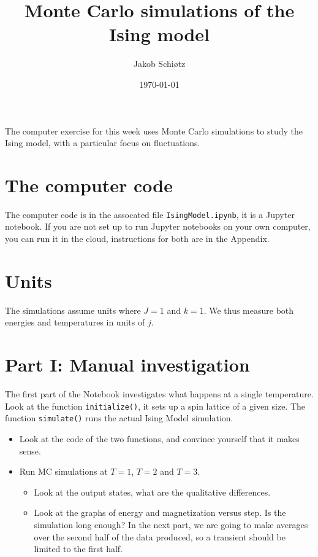 \documentclass[a4paper,11pt]{article}
\begin{document}
\title{Monte Carlo simulations of the Ising model}
\author{Jakob Schiøtz}
\date{\today}
\maketitle

The computer exercise for this week uses Monte Carlo simulations to
study the Ising model, with a particular focus on fluctuations.

\section{The computer code}

The computer code is in the assocated file \texttt{IsingModel.ipynb},
it is a Jupyter notebook.  If you are not set up to run Jupyter
notebooks on your own computer, you can run it in the cloud,
instructions for both are in the Appendix.

\section{Units}

The simulations assume units where $J=1$ and $k=1$.  We thus measure
both energies and temperatures in units of $j$.

\section{Part I: Manual investigation}

The first part of the Notebook investigates what happens at a single
temperature.  Look at the function \texttt{initialize()}, it sets up a
spin lattice of a given size.  The function \texttt{simulate()} runs
the actual Ising Model simulation.

\begin{itemize}
\item Look at the code of the two functions, and convince yourself
  that it makes sense.
\item Run MC simulations at $T=1$, $T=2$ and $T=3$.
  \begin{itemize}
  \item Look at the output states, what are the qualitative
    differences.
  \item Look at the graphs of energy and magnetization versus step.
    Is the simulation long enough?  In the next part, we are going to
    make averages over the second half of the data produced, so a
    transient should be limited to the first half.
  \end{itemize}
\end{itemize}
\end{document}
